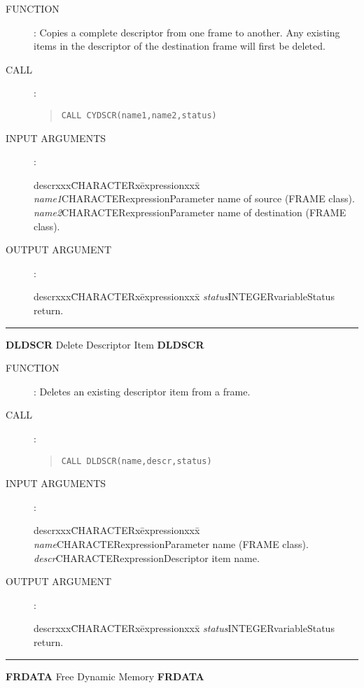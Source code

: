 \begin{description}
\item [FUNCTION]:
Copies a complete descriptor from one frame to another.
Any existing items in the descriptor of the destination frame will first be
deleted.
\item [CALL]:
\begin{quote}
{\tt CALL CYDSCR(name1,name2,status)}
\end{quote}
\item [INPUT ARGUMENTS]:
\begin{tabbing}
descrxxx\=CHARACTERx\=expressionxxx\=\kill
{\em name1}\>CHARACTER\>expression\>Parameter name of source (FRAME class).\\
{\em name2}\>CHARACTER\>expression\>Parameter name of destination (FRAME class).
\end{tabbing}
\item [OUTPUT ARGUMENT]:
\begin{tabbing}
descrxxx\=CHARACTERx\=expressionxxx\=\kill
{\em status}\>INTEGER\>variable\>Status return.
\end{tabbing}
\end{description}
\rule{\textwidth}{0.3mm}
{\Large {\bf DLDSCR} \hfill Delete Descriptor Item \hfill {\bf DLDSCR}}
\begin{description}
\item [FUNCTION]:
Deletes an existing descriptor item from a frame.
\item [CALL]:
\begin{quote}
{\tt CALL DLDSCR(name,descr,status)}
\end{quote}
\item [INPUT ARGUMENTS]:
\begin{tabbing}
descrxxx\=CHARACTERx\=expressionxxx\=\kill
{\em name}\>CHARACTER\>expression\>Parameter name (FRAME class).\\
{\em descr}\>CHARACTER\>expression\>Descriptor item name.
\end{tabbing}
\item [OUTPUT ARGUMENT]:
\begin{tabbing}
descrxxx\=CHARACTERx\=expressionxxx\=\kill
{\em status}\>INTEGER\>variable\>Status return.
\end{tabbing}
\end{description}
\rule{\textwidth}{0.3mm}
{\Large {\bf FRDATA} \hfill Free Dynamic Memory \hfill {\bf FRDATA}}
